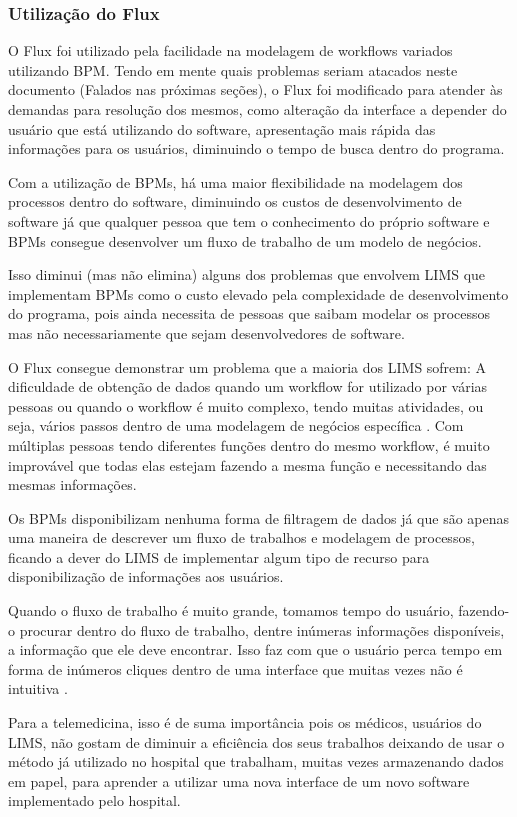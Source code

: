 
\subsubsection{Utilização do Flux}

O Flux foi utilizado pela facilidade na modelagem de workflows variados utilizando BPM. Tendo em mente quais problemas seriam atacados neste documento (Falados nas próximas seções), o Flux foi modificado para atender às demandas para resolução dos mesmos, como alteração da interface a depender do usuário que está utilizando do software, apresentação mais rápida das informações para os usuários, diminuindo o tempo de busca dentro do programa.


Com a utilização de BPMs, há uma maior flexibilidade na modelagem dos processos dentro do software, diminuindo os custos de desenvolvimento de software já que qualquer pessoa que tem o conhecimento do próprio software e BPMs consegue desenvolver um fluxo de trabalho de um modelo de negócios.

Isso diminui (mas não elimina) alguns dos problemas que envolvem LIMS que implementam BPMs como o custo elevado pela complexidade de desenvolvimento do programa, pois ainda necessita de pessoas que saibam modelar os processos mas não necessariamente que sejam desenvolvedores de software.


O Flux consegue demonstrar um problema que a maioria dos LIMS sofrem: A dificuldade de obtenção de dados quando um workflow for utilizado por várias pessoas ou quando o workflow é muito complexo, tendo muitas atividades, ou seja, vários passos dentro de uma modelagem de negócios específica \R. Com múltiplas pessoas tendo diferentes funções dentro do mesmo workflow, é muito improvável que todas elas estejam fazendo a mesma função e necessitando das mesmas informações.

Os BPMs disponibilizam nenhuma forma de filtragem de dados já que são apenas uma maneira de descrever um fluxo de trabalhos e modelagem de processos, ficando a dever do LIMS de implementar algum tipo de recurso para disponibilização de informações aos usuários.

Quando o fluxo de trabalho é muito grande, tomamos tempo do usuário, fazendo-o procurar dentro do fluxo de trabalho, dentre inúmeras informações disponíveis, a informação que ele deve encontrar. Isso faz com que o usuário perca tempo em forma de inúmeros cliques dentro de uma interface que muitas vezes não é intuitiva \R.

Para a telemedicina, isso é de suma importância pois os médicos, usuários do LIMS, não gostam de diminuir a eficiência dos seus trabalhos deixando de usar o método já utilizado no hospital que trabalham, muitas vezes armazenando dados em papel, para aprender a utilizar uma nova interface de um novo software implementado pelo hospital.